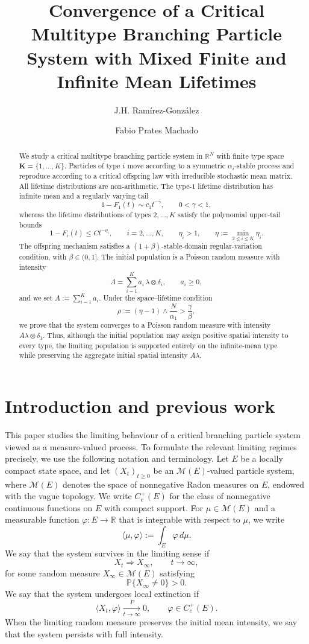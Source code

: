 \documentclass[reqno,final,11pt]{amsart}
\title[Mixed Finite–Infinite Mean Multitype Branching Systems]{Convergence of a Critical Multitype Branching Particle System with Mixed Finite and Infinite Mean Lifetimes}
\author[J.H. Ram\'{i}rez-Gonz\'{a}lez]{ J.H. Ram\'{i}rez-Gonz\'{a}lez}
\author{Fabio Prates Machado}
\newcommand{\R}{\mathbb R}
\newcommand{\Pbb}{\mathbb P}
\newcommand{\Kk}{\mathbf K}
\newcommand{\ip}[2]{\langle #1,#2\rangle}
\newcommand{\cM}{\mathcal M}
\theoremstyle{plain}
\theoremstyle{definition}
\theoremstyle{remark}
\numberwithin{equation}{section}
\begin{document}
\begin{abstract}
We study a critical multitype branching particle system in
\(\R^N\) with finite type space \(\Kk=\{1,\dots,K\}\).
Particles of type \(i\) move according to a symmetric
\(\alpha_i\)-stable process and reproduce according to a critical
offspring law with irreducible stochastic mean matrix.
All lifetime distributions are non-arithmetic. The type-\(1\) lifetime distribution has infinite
mean and a regularly varying tail
\[
  1-F_1(t)\sim c_1t^{-\gamma},
  \qquad 0<\gamma<1,
\]
whereas the lifetime distributions of types \(2,\dots,K\) satisfy the
polynomial upper-tail bounds
\[
  1-F_i(t)\le C t^{-\eta_i},
  \qquad i=2,\dots,K,
  \qquad \eta_i>1,
  \qquad
  \eta:=\min_{2\le i\le K}\eta_i.
\]
The offspring mechanism satisfies a \((1+\beta)\)-stable-domain
regular-variation condition, with \(\beta\in(0,1]\).
The initial population is a Poisson random measure with intensity
\[
  \Lambda=\sum_{i=1}^K a_i\,\lambda\otimes\delta_i,
  \qquad a_i\ge0,
\]
and we set \(A:=\sum_{i=1}^K a_i\).
Under the space--lifetime condition
\[
  \rho:=\left(\eta-1\right)\wedge\frac{N}{\alpha_1}
  >
  \frac{\gamma}{\beta},
\]
we prove that the system converges to a Poisson random measure with
intensity \(A\lambda\otimes\delta_1\).
Thus, although the initial population may assign positive spatial
intensity to every type, the limiting population is supported entirely
on the infinite-mean type while preserving the aggregate initial
spatial intensity \(A\lambda\).
\end{abstract}
\maketitle




\section{Introduction and previous work}


This paper studies the limiting behaviour of a critical branching particle system viewed as a measure-valued process. To formulate the relevant limiting regimes precisely, we use the following notation and terminology. Let \(E\) be a locally compact state space, and let \((X_t)_{t\ge0}\) be an \(\cM(E)\)-valued particle system, where \(\cM(E)\) denotes the space of nonnegative Radon measures on \(E\), endowed with the vague topology. We write \(C_c^+(E)\) for the class of nonnegative continuous functions on \(E\) with compact support. For \(\mu\in\cM(E)\) and a measurable function \(\varphi:E\to\R\) that is integrable with respect to \(\mu\), we write
\[
  \ip{\mu}{\varphi}:=\int_E\varphi\,d\mu.
\]
We say that the system survives in the limiting sense if
\[
  X_t\Rightarrow X_\infty,\qquad t\to\infty,
\]
for some random measure \(X_\infty\in\cM(E)\) satisfying
\[
  \Pbb\{X_\infty\ne0\}>0.
\]
We say that the system undergoes local extinction if
\[
  \ip{X_t}{\varphi}\xrightarrow[t\to\infty]{P}0,
  \qquad \varphi\in C_c^+(E).
\]
When the limiting random measure preserves the initial mean intensity, we say that the system persists with full intensity.
\end{document}
